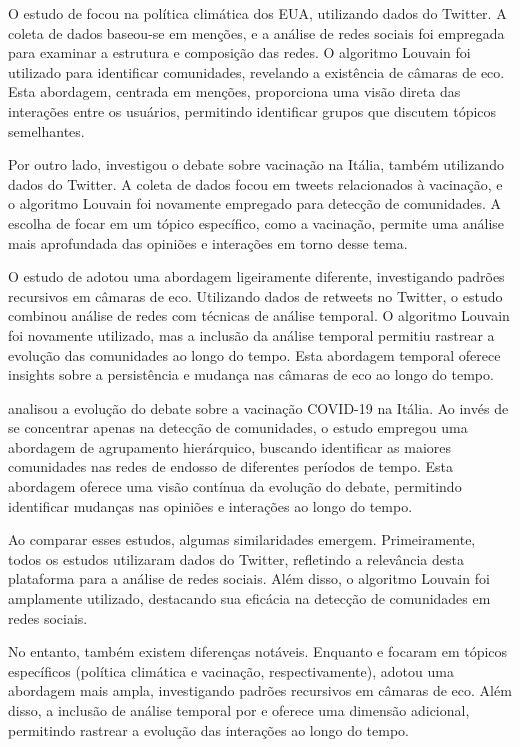 O estudo de  focou na política climática dos EUA, utilizando dados do Twitter. A coleta de dados baseou-se em menções, e a análise de redes sociais foi empregada para examinar a estrutura e composição das redes. O algoritmo Louvain foi utilizado para identificar comunidades, revelando a existência de câmaras de eco. Esta abordagem, centrada em menções, proporciona uma visão direta das interações entre os usuários, permitindo identificar grupos que discutem tópicos semelhantes.

Por outro lado,  investigou o debate sobre vacinação na Itália, também utilizando dados do Twitter. A coleta de dados focou em tweets relacionados à vacinação, e o algoritmo Louvain foi novamente empregado para detecção de comunidades. A escolha de focar em um tópico específico, como a vacinação, permite uma análise mais aprofundada das opiniões e interações em torno desse tema.

O estudo de  adotou uma abordagem ligeiramente diferente, investigando padrões recursivos em câmaras de eco. Utilizando dados de retweets no Twitter, o estudo combinou análise de redes com técnicas de análise temporal. O algoritmo Louvain foi novamente utilizado, mas a inclusão da análise temporal permitiu rastrear a evolução das comunidades ao longo do tempo. Esta abordagem temporal oferece insights sobre a persistência e mudança nas câmaras de eco ao longo do tempo.

 analisou a evolução do debate sobre a vacinação COVID-19 na Itália. Ao invés de se concentrar apenas na detecção de comunidades, o estudo empregou uma abordagem de agrupamento hierárquico, buscando identificar as maiores comunidades nas redes de endosso de diferentes períodos de tempo. Esta abordagem oferece uma visão contínua da evolução do debate, permitindo identificar mudanças nas opiniões e interações ao longo do tempo.

Ao comparar esses estudos, algumas similaridades emergem. Primeiramente, todos os estudos utilizaram dados do Twitter, refletindo a relevância desta plataforma para a análise de redes sociais. Além disso, o algoritmo Louvain foi amplamente utilizado, destacando sua eficácia na detecção de comunidades em redes sociais.

No entanto, também existem diferenças notáveis. Enquanto  e  focaram em tópicos específicos (política climática e vacinação, respectivamente),  adotou uma abordagem mais ampla, investigando padrões recursivos em câmaras de eco. Além disso, a inclusão de análise temporal por  e  oferece uma dimensão adicional, permitindo rastrear a evolução das interações ao longo do tempo.

